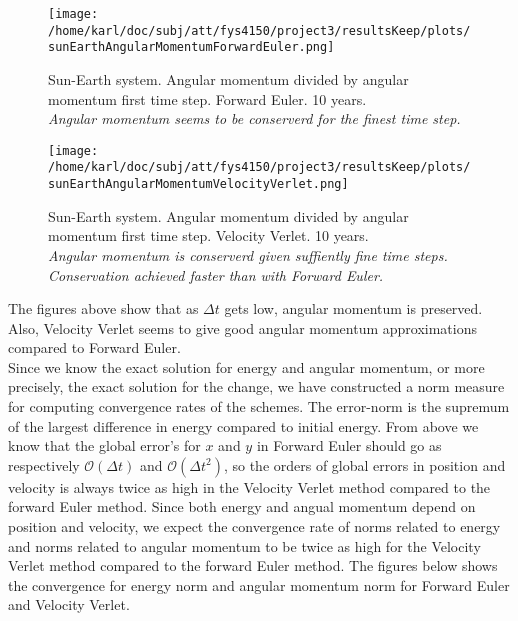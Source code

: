 \documentclass{article}
\begin{document}
\begin{minipage}{.49\textwidth} 
	\begin{figure}[H]
		\centering
		\texttt{[image: /home/karl/doc/subj/att/fys4150/project3/resultsKeep/plots/sunEarthAngularMomentumForwardEuler.png]}
		\caption{Sun-Earth system. Angular momentum divided by angular momentum first time step. Forward Euler. 10 years. \\ \textit{Angular momentum seems to be conserverd for the finest time step.}}
		\label{1}
	\end{figure}
\end{minipage}\hfill
\begin{minipage}{.49\textwidth} 
	\begin{figure}[H]
		\centering
		\texttt{[image: /home/karl/doc/subj/att/fys4150/project3/resultsKeep/plots/sunEarthAngularMomentumVelocityVerlet.png]}
		\caption{Sun-Earth system. Angular momentum divided by angular momentum first time step. Velocity Verlet. 10 years. \\ \textit{Angular momentum is conserverd given suffiently fine time steps. Conservation achieved faster than with Forward Euler.}}
		\label{1}
	\end{figure}
\end{minipage}\hfill
\vspace{2ex}

The figures above show that as $\Delta t$ gets low, angular momentum is preserved. Also, Velocity Verlet seems to give good angular momentum approximations compared to Forward Euler.\\

Since we know the exact solution for energy and angular momentum, or more precisely, the exact solution for the change, we have constructed a norm measure for computing convergence rates of the schemes. The error-norm is the supremum of the largest difference in energy compared to initial energy. From above we know that the global error's for $x$ and $y$ in Forward Euler should go as respectively $\mathcal{O}(\Delta t)$ and $\mathcal{O}(\Delta t^2)$, so the orders of global errors in position and velocity is always twice as high in the Velocity Verlet method compared to the forward Euler method. Since both energy and angual momentum depend on position and velocity, we expect the convergence rate of norms related to energy and norms related to angular momentum to be twice as high for the Velocity Verlet method compared to the forward Euler method. The figures below shows the convergence for energy norm and angular momentum norm for Forward Euler and Velocity Verlet.
\end{document}
